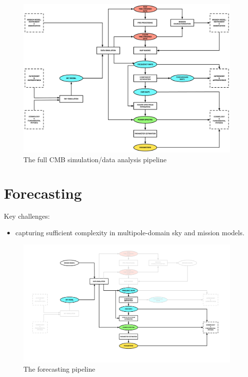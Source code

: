 \begin{figure}[htbp]
\centering
\includegraphics[width=1\textwidth]{simda}
\caption{The full CMB simulation/data analysis pipeline}
\label{default}

\end{figure}

\newpage

\section{Forecasting}

Key challenges: 
\begin{itemize}
\item capturing sufficient complexity in multipole-domain sky and mission models.
\end{itemize}

\begin{figure}[htbp]
\centering
\includegraphics[width=1\textwidth]{fc}
\caption{The forecasting pipeline}
\label{default}

\end{figure}

